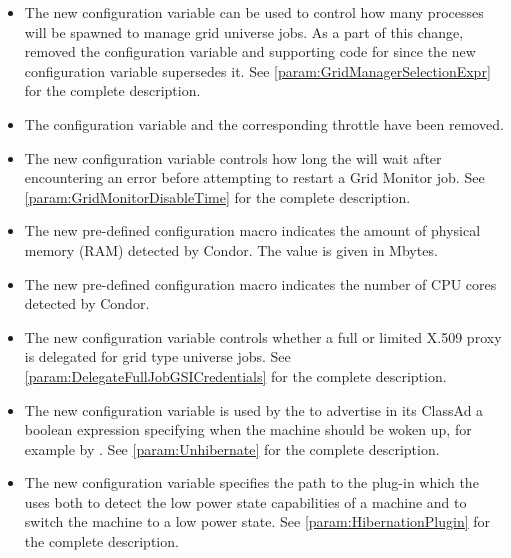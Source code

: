 \begin{itemize}
\item The new configuration variable 
can be used to control how many  processes will be
spawned to manage grid universe jobs. As a part of this change, removed
the configuration variable and supporting code for 
 since the new configuration variable
supersedes it.
See \ref{param:GridManagerSelectionExpr} for the complete description.

\item The configuration variable
 and the
corresponding throttle 
have been removed.

\item The new configuration variable 
controls how long the  will wait after encountering
an error before attempting to restart a Grid Monitor job.
See \ref{param:GridMonitorDisableTime} for the complete description.

\item The new pre-defined configuration macro 
indicates the amount of physical memory (RAM) detected by Condor.
The value is given in Mbytes.

\item The new pre-defined configuration macro 
indicates the number of CPU cores detected by Condor.

\item The new configuration variable
controls whether a full or limited X.509 proxy is delegated for grid type
  universe jobs.
See \ref{param:DelegateFullJobGSICredentials}
for the complete description.

\item The new configuration variable  is used by
the  to advertise in its ClassAd a boolean expression
specifying when the machine should be woken up, 
for example by .
See \ref{param:Unhibernate} for the complete description.

\item The new configuration variable  specifies the
  path to the plug-in which the  uses both to detect
  the low power state capabilities of a machine and to switch the
  machine to a low power state.
  See \ref{param:HibernationPlugin} for the complete description.


\end{itemize}
